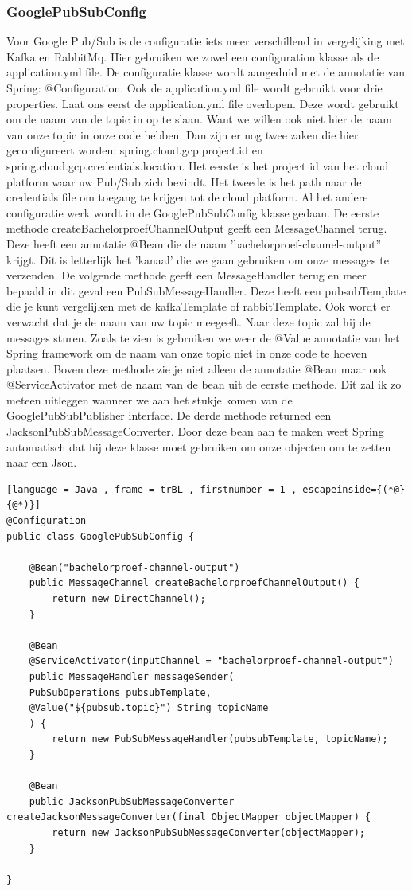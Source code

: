\subsubsection{GooglePubSubConfig}
Voor Google Pub/Sub is de configuratie iets meer verschillend in vergelijking met Kafka en RabbitMq. Hier gebruiken we zowel een configuration klasse als de application.yml file. De configuratie klasse wordt aangeduid met de annotatie van Spring: @Configuration. Ook de application.yml file wordt gebruikt voor drie properties. Laat ons eerst de application.yml file overlopen. Deze wordt gebruikt om de naam van de topic in op te slaan. Want we willen ook niet hier de naam van onze topic in onze code hebben. Dan zijn er nog twee zaken die hier geconfigureert worden: spring.cloud.gcp.project.id en spring.cloud.gcp.credentials.location. Het eerste is het project id van het cloud platform waar uw Pub/Sub zich bevindt. Het tweede is het path naar de credentials file om toegang te krijgen tot de cloud platform. Al het andere configuratie werk wordt in de GooglePubSubConfig klasse gedaan. De eerste methode createBachelorproefChannelOutput geeft een MessageChannel terug. Deze heeft een annotatie @Bean die de naam 'bachelorproef-channel-output'' krijgt. Dit is letterlijk het 'kanaal' die we gaan gebruiken om onze messages te verzenden. De volgende methode geeft een MessageHandler terug en meer bepaald in dit geval een PubSubMessageHandler. Deze heeft een pubsubTemplate die je kunt vergelijken met de kafkaTemplate of rabbitTemplate. Ook wordt er verwacht dat je de naam van uw topic meegeeft. Naar deze topic zal hij de messages sturen. Zoals te zien is gebruiken we weer de @Value annotatie van het Spring framework om de naam van onze topic niet in onze code te hoeven plaatsen. Boven deze methode zie je niet alleen de annotatie @Bean maar ook @ServiceActivator met de naam van de bean uit de eerste methode. Dit zal ik zo meteen uitleggen wanneer we aan het stukje komen van de GooglePubSubPublisher interface. De derde methode returned een JacksonPubSubMessageConverter. Door deze bean aan te maken weet Spring automatisch dat hij deze klasse moet gebruiken om onze objecten om te zetten naar een Json.

 \begin{lstlisting}[language = Java , frame = trBL , firstnumber = 1 , escapeinside={(*@}{@*)}]
@Configuration
public class GooglePubSubConfig {
    
    @Bean("bachelorproef-channel-output")
    public MessageChannel createBachelorproefChannelOutput() {
        return new DirectChannel();
    }
    
    @Bean
    @ServiceActivator(inputChannel = "bachelorproef-channel-output")
    public MessageHandler messageSender(
    PubSubOperations pubsubTemplate,
    @Value("${pubsub.topic}") String topicName
    ) {
        return new PubSubMessageHandler(pubsubTemplate, topicName);
    }
    
    @Bean
    public JacksonPubSubMessageConverter createJacksonMessageConverter(final ObjectMapper objectMapper) {
        return new JacksonPubSubMessageConverter(objectMapper);
    }
    
}
     \end{lstlisting}
